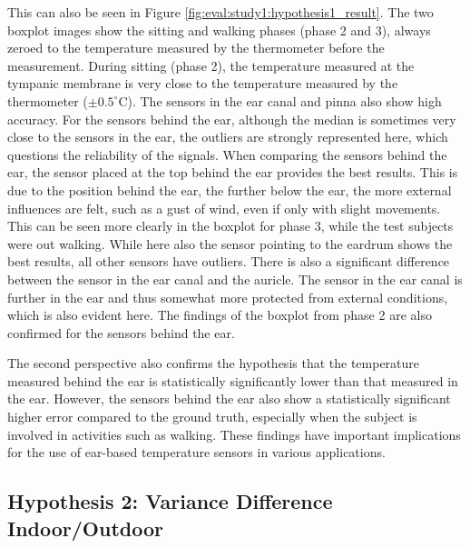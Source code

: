 This can also be seen in Figure \ref{fig:eval:study1:hypothesis1_result}.
The two boxplot images show the sitting and walking phases (phase 2 and 3), always zeroed to the temperature measured by the thermometer before the measurement.
During sitting (phase 2), the temperature measured at the tympanic membrane is very close to the temperature measured by the thermometer ($\pm0.5^\circ\text{C}$). 
The sensors in the ear canal and pinna also show high accuracy. 
For the sensors behind the ear, although the median is sometimes very close to the sensors in the ear, the outliers are strongly represented here, which questions the reliability of the signals.
When comparing the sensors behind the ear, the sensor placed at the top behind the ear provides the best results. 
This is due to the position behind the ear, the further below the ear, the more external influences are felt, such as a gust of wind, even if only with slight movements.
This can be seen more clearly in the boxplot for phase 3, while the test subjects were out walking. 
While here also the sensor pointing to the eardrum shows the best results, all other sensors have outliers.
There is also a significant difference between the sensor in the ear canal and the auricle. 
The sensor in the ear canal is further in the ear and thus somewhat more protected from external conditions, which is also evident here. 
The findings of the boxplot from phase 2 are also confirmed for the sensors behind the ear.

The second perspective also confirms the hypothesis that the temperature measured behind the ear is statistically significantly lower than that measured in the ear. 
However, the sensors behind the ear also show a statistically significant higher error compared to the ground truth, especially when the subject is involved in activities such as walking. 
These findings have important implications for the use of ear-based temperature sensors in various applications.

\subsection{Hypothesis 2: Variance Difference Indoor/Outdoor}
\label{subsec:Evaluation:Study2:Hypothesis2}

